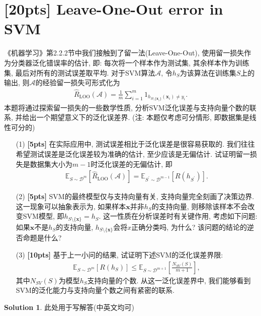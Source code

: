 \documentclass[a4paper,UTF8]{article}
\numberwithin{equation}{section}
\theoremstyle{definition}
\newtheorem*{solution}{Solution}
\def \x {\boldsymbol{x}}
\begin{document}
\section{[20pts] Leave-One-Out error in SVM}
《机器学习》第2.2.2节中我们接触到了留一法(Leave-One-Out), 使用留一损失作为分类器泛化错误率的估计, 即: 每次将一个样本作为测试集, 其余样本作为训练集, 最后对所有的测试误差取平均. 对于SVM算法$\mathcal{A}$, 令$h_{S}$为该算法在训练集$S$上的输出, 则$\mathcal{A}$的经验留一损失可形式化为
\begin{align*}
    \hat R_{\text{LOO}}(\mathcal{A}) = \frac1m \sum_{i=1}^m \mathrm{1}_{h_{S \setminus \{\x_i\}}(\x_i) \neq y_i}.
\end{align*}
本题将通过探索留一损失的一些数学性质, 分析SVM泛化误差与支持向量个数的联系, 并给出一个期望意义下的泛化误差界. (注: 本题仅考虑可分情形, 即数据集是线性可分的)
\begin{enumerate}
	\item[(1)] \textbf{[5pts]} 在实际应用中, 测试误差相比于泛化误差是很容易获取的. 我们往往希望测试误差是泛化误差较为准确的估计, 至少应该是无偏估计. 试证明留一损失是数据集大小为$m-1$时泛化误差的无偏估计, 即
	\begin{align*}
        \mathbb{E}_{S \sim \mathcal{D}^m}[\hat{R}_{\mathrm{LOO}}(\mathcal{A})]=\mathbb{E}_{S^{\prime} \sim \mathcal{D}^{m-1}}\left[R\left(h_{S^{\prime}}\right)\right].
    \end{align*}
	\item[(2)] \textbf{[5pts]} SVM的最终模型仅与支持向量有关, 支持向量完全刻画了决策边界. 这一现象可以抽象表示为, 如果样本$\x$并非$h_S$的支持向量, 则移除该样本不会改变SVM模型, 即$h_{S \setminus \{\x\}} = h_S$. 这一性质在分析误差时有关键作用, 考虑如下问题:
	如果$\x$不是$h_S$的支持向量, $h_{S \setminus \{\x\}}$会将$x$正确分类吗, 为什么? 该问题的结论的逆否命题是什么? 
	\item[(3)] \textbf{[10pts]} 基于上一小问的结果, 试证明下述SVM的泛化误差界限:
	\begin{align*}
        \mathbb{E}_{S \sim \mathcal{D}^m}\left[R(h_S)\right] \leq \mathbb{E}_{S \sim \mathcal{D}^{m+1}} \left[\frac{N_{SV}(S)}{m+1}\right],
    \end{align*}
    其中$N_{SV}(S)$为模型$h_S$支持向量的个数. 从这一泛化误差界中, 我们能够看到SVM的泛化能力与支持向量个数之间有紧密的联系.

\end{enumerate}

\begin{solution}
	此处用于写解答(中英文均可)
	~\\
	~\\
	~\\
\end{solution}
\end{document}
